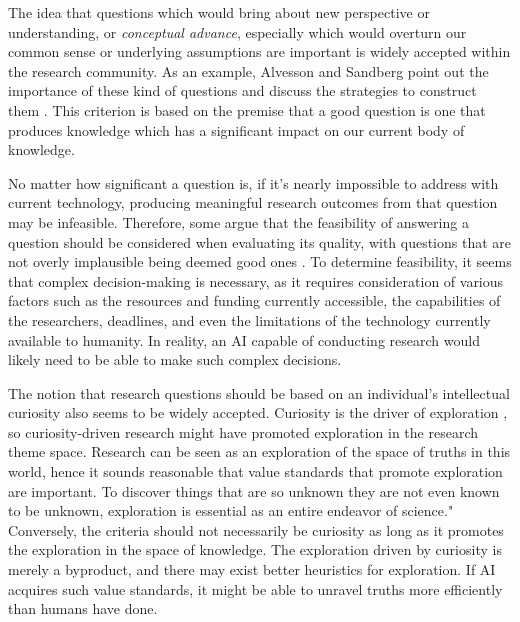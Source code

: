 The idea that questions which would bring about new perspective or understanding, or \textit{conceptual advance}, especially which would overturn our common sense or underlying assumptions are important is widely accepted within the research community. As an example, Alvesson and Sandberg point out the importance of these kind of questions and discuss the strategies to construct them \cite{alvesson2013constructing}. 
This criterion is based on the premise that a good question is one that produces knowledge which has a significant impact on our current body of knowledge.

No matter how significant a question is, if it's nearly impossible to address with current technology, producing meaningful research outcomes from that question may be infeasible. Therefore, some argue that the feasibility of answering a question should be considered when evaluating its quality, with questions that are not overly implausible being deemed good ones \cite{hulley2007designing,alon2009choose,huntington2021effect}. To determine feasibility, it seems that complex decision-making is necessary, as it requires consideration of various factors such as the resources and funding currently accessible, the capabilities of the researchers, deadlines, and even the limitations of the technology currently available to humanity. In reality, an AI capable of conducting research would likely need to be able to make such complex decisions.

The notion that research questions should be based on an individual's intellectual curiosity also seems to be widely accepted. Curiosity is the driver of exploration \cite{oudeyer2018computational}, so curiosity-driven research might have promoted exploration in the research theme space. Research can be seen as an exploration of the space of truths in this world, hence it sounds reasonable that value standards that promote exploration are important.
To discover things that are so unknown they are not even known to be unknown, exploration is essential as an entire endeavor of science."
Conversely, the criteria should not necessarily be curiosity as long as it promotes the exploration in the space of knowledge. The exploration driven by curiosity is merely a byproduct, and there may exist better heuristics for exploration. If AI acquires such value standards, it might be able to unravel truths more efficiently than humans have done.


